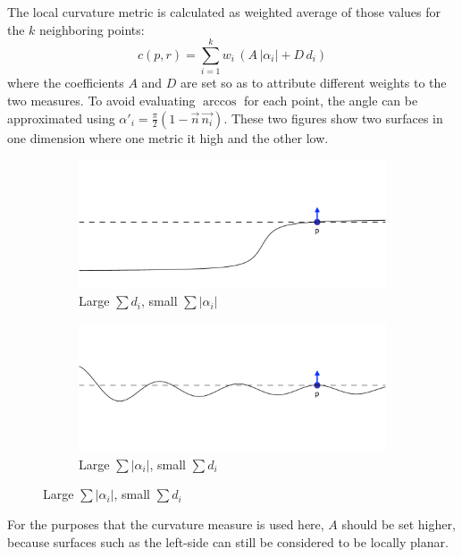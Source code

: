 The local curvature metric is calculated as weighted average of those values for the $k$ neighboring points:
\begin{equation}
c(p, r) = \sum_{i=1}^{k} w_i \, \left( A \, |\alpha_i| + D \, d_i \right)
\end{equation}
where the coefficients $A$ and $D$ are set so as to attribute different weights to the two measures. To avoid evaluating $\arccos$ for each point, the angle can be approximated using $\alpha'_i = \frac{\pi}{2} (1 - \vec{n} \, \vec{n_i})$. These two figures show two surfaces in one dimension where one metric it high and the other low.
\begin{figure}[H]
\centering
\begin{subfigure}{.4\textwidth}
	\includegraphics[width=\linewidth]{fig/curvature_distances.pdf}
	\caption{Large $\sum d_i$, small $\sum |\alpha_i|$}
\end{subfigure}%
\hspace{15mm}%
\begin{subfigure}{.4\textwidth}
	\includegraphics[width=\linewidth]{fig/curvature_angles.pdf}
	\caption{Large $\sum |\alpha_i|$, small $\sum d_i$}
\end{subfigure}	
\end{figure}
For the purposes that the curvature measure is used here, $A$ should be set higher, because surfaces such as the left-side can still be considered to be locally planar.






